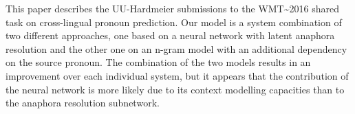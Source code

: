 This paper describes the UU-Hardmeier submissions to the WMT{\textasciitilde}2016 shared task on cross-lingual pronoun prediction. Our model is a system combination of two different approaches, one based on a neural network with latent anaphora resolution and the other one on an n-gram model with an additional dependency on the source pronoun. The combination of the two models results in an improvement over each individual system, but it appears that the contribution of the neural network is more likely due to its context modelling capacities than to the anaphora resolution subnetwork.
